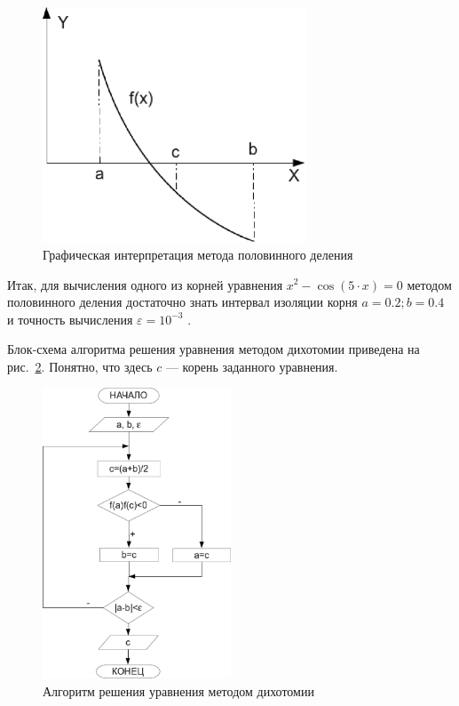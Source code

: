 \begin{figure}[htb]
\begin{center}
\includegraphics[width=0.7\textwidth]{img/ris_4_3}
\caption{Графическая интерпретация метода половинного деления}
\label{ch04:refDrawing2}
\end{center}
\end{figure}

Итак, для вычисления одного из корней уравнения  $x^2-\cos (5\cdot x)=0$  методом половинного деления достаточно знать
интервал изоляции корня  $a=0.2;b=0.4$  и точность вычисления  $\varepsilon=10^{-3}$ . 

Блок-схема алгоритма решения уравнения методом дихотомии приведена на рис.~\ref{ch04:refDrawing3}. 
Понятно, что здесь  $c$  --- корень заданного уравнения.

\begin{figure}[htb]
\begin{center}
\includegraphics[width=0.5\textwidth]{img/ris_4_4}
\caption{Алгоритм решения уравнения методом дихотомии}
\label{ch04:refDrawing3}
\end{center}
\end{figure}

